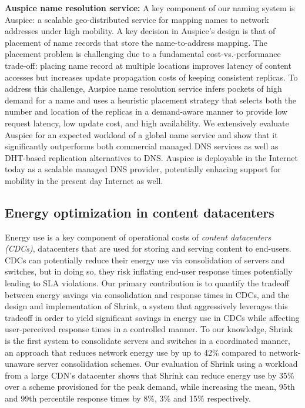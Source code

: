 \textbf{Auspice name resolution service:}  A key component of our naming system is Auspice: a scalable geo-distributed service for mapping names to network addresses under high mobility. A key decision in Auspice's design is that of placement of name records that store the name-to-address mapping. The placement problem is challenging due to a fundamental cost-vs.-performance trade-off: placing name record at multiple locations improves latency of content accesses but increases update propagation costs of keeping consistent replicas. To address this challenge, Auspice name resolution service infers pockets of high demand for a name and uses a heuristic placement strategy that selects both the number and location of the replicas in a demand-aware manner to provide low request latency, low update cost, and high availability.  We extensively evaluate Auspice for an expected workload of a global name service and show that it significantly outperforms both commercial managed DNS services as well as DHT-based replication alternatives to DNS. Auspice is deployable in the Internet today as a scalable managed DNS provider, potentially enhacing support for mobility in the present day Internet as well.

\subsection{Energy optimization in content datacenters}
\label{sec:intro-cdc}
Energy use is a key component of operational costs of \emph{content datacenters (CDCs)}, datacenters that are used for storing and serving content to end-users. CDCs can potentially reduce their energy use via consolidation of servers and switches, but in doing so, they risk inflating end-user response times potentially leading to SLA violations. Our primary contribution is to quantify the tradeoff between energy savings via consolidation and response times in CDCs, and the design and implementation of Shrink, a system that aggressively leverages this tradeoff in order to yield significant savings in energy use in CDCs while affecting user-perceived response times in a controlled manner. To our knowledge, Shrink is the first system to consolidate servers and switches in a coordinated manner, an approach that reduces network energy use by up to 42\% compared to network-unaware server consolidation schemes. Our evaluation of Shrink using a workload from a large CDN's datacenter shows that Shrink can reduce energy use by 35\% over a scheme provisioned for the peak demand, while increasing the mean, 95th and 99th percentile response times by 8\%, 3\% and 15\% respectively.



